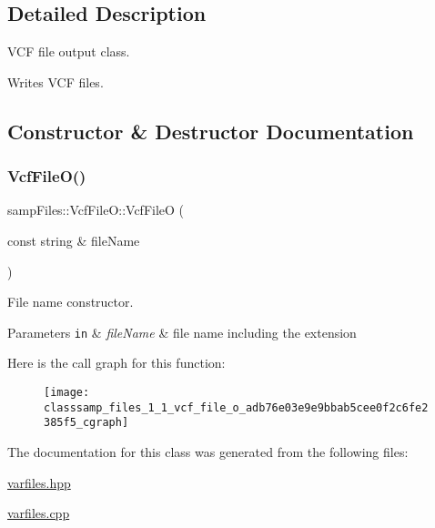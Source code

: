 \subsection{Detailed Description}
V\+CF file output class. 

Writes V\+CF files. 

\subsection{Constructor \& Destructor Documentation}
\mbox{\label{classsamp_files_1_1_vcf_file_o_adb76e03e9e9bbab5cee0f2c6fe2385f5}} 
\subsubsection{\texorpdfstring{Vcf\+File\+O()}{VcfFileO()}}
{\footnotesize\ttfamily samp\+Files\+::\+Vcf\+File\+O\+::\+Vcf\+FileO (\begin{DoxyParamCaption}\item[{const string \&}]{file\+Name }\end{DoxyParamCaption})\hspace{0.3cm}{\ttfamily [inline]}}



File name constructor. 


\begin{DoxyParams}[1]{Parameters}
\mbox{\tt in}  & {\em file\+Name} & file name including the extension \\
\hline
\end{DoxyParams}
Here is the call graph for this function\+:\nopagebreak
\begin{figure}[H]
\begin{center}
\leavevmode
\texttt{[image: classsamp\_files\_1\_1\_vcf\_file\_o\_adb76e03e9e9bbab5cee0f2c6fe2385f5\_cgraph]}
\end{center}
\end{figure}


The documentation for this class was generated from the following files\+:\begin{DoxyCompactItemize}
\item 
\hyperlink{varfiles_8hpp}{varfiles.\+hpp}\item 
\hyperlink{varfiles_8cpp}{varfiles.\+cpp}\end{DoxyCompactItemize}
